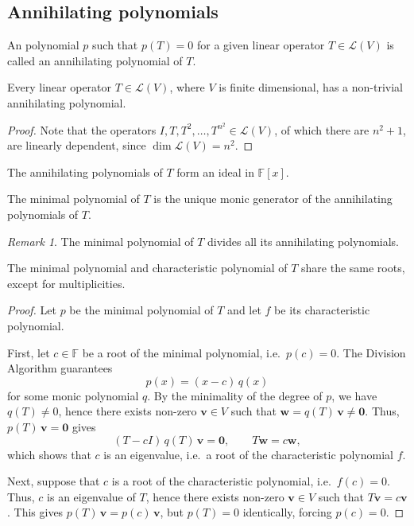 \documentclass[11pt]{article}
\newcommand{\F}{\mathbb{F}}
\newcommand{\I}{I}
\renewcommand{\vec}[1]{\boldsymbol{#1}}
\newcommand{\vv}{\vec{v}}
\newcommand{\vw}{\vec{w}}
\newcommand{\alg}[1]{\mathscr{#1}}
\newcommand{\algL}{\alg{L}}
\newcommand{\dim}{\operatorname{dim}}
\theoremstyle{definition}
\theoremstyle{remark}
\newtheorem*{remark}{Remark}
\numberwithin{equation}{section}
\begin{document}
    \subsection{Annihilating polynomials}
    
    \begin{definition}
        An polynomial $p$ such that $p(T) = 0$ for a given linear operator $T \in
        \algL(V)$ is called an annihilating polynomial of $T$.
    \end{definition}

    \begin{lemma}
        Every linear operator $T\in\algL(V)$, where $V$ is finite dimensional, has
        a non-trivial annihilating polynomial.
    \end{lemma}
    \begin{proof}
        Note that the operators $\I, T, T^2, \dots, T^{n^2} \in \algL(V)$, of
        which there are $n^2 + 1$, are linearly dependent, since $\dim{\algL(V)} =
        n^2$.
    \end{proof}

    \begin{lemma}
        The annihilating polynomials of $T$ form an ideal in $\F[x]$.
    \end{lemma}

    \begin{definition}
        The minimal polynomial of $T$ is the unique monic generator of the
        annihilating polynomials of $T$.
        \begin{remark}
            The minimal polynomial of $T$ divides all its annihilating polynomials.
        \end{remark}
    \end{definition}

    \begin{theorem}
        The minimal polynomial and characteristic polynomial of $T$ share the same
        roots, except for multiplicities.
    \end{theorem}
    \begin{proof}
        Let $p$ be the minimal polynomial of $T$ and let $f$ be its characteristic
        polynomial.

        First, let $c \in \F$ be a root of the minimal polynomial, i.e.\ $p(c) = 0$.
        The Division Algorithm guarantees \[
            p(x) = (x - c)\, q(x)
        \] for some monic polynomial $q$. By the minimality of the degree of $p$, we
        have $q(T) \neq 0$, hence there exists non-zero $\vv \in V$ such that $\vw =
        q(T)\,\vv \neq \vec{0}$. Thus, $p(T)\,\vv = \vec{0}$ gives \[
            (T - c \I)\, q(T)\, \vv = \vec{0}, \qquad T\vw = c\vw,
        \] which shows that $c$ is an eigenvalue, i.e.\ a root of the characteristic
        polynomial $f$.

        Next, suppose that $c$ is a root of the characteristic polynomial, i.e.\
        $f(c) = 0$. Thus, $c$ is an eigenvalue of $T$, hence there exists non-zero
        $\vv \in V$ such that $T\vv = c\vv$. This gives $p(T)\,\vv = p(c)\,\vv$, but
        $p(T) = 0$ identically, forcing $p(c) = 0$.
    \end{proof}
\end{document}
